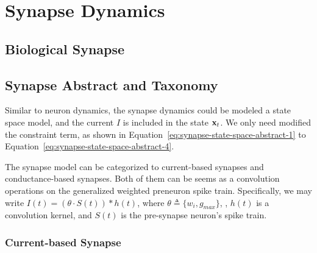 
\chapter{Synapse Dynamics}
\section{Biological Synapse}

\section{Synapse Abstract and Taxonomy}
Similar to neuron dynamics, the synapse dynamics could be modeled a state space model,
and the current $I$ is included in the state $\bold x_t$. We only need modified the 
constraint term, as shown in Equation~\ref{eq:synapse-state-space-abstract-1} to 
Equation~\ref{eq:synapse-state-space-abstract-4}. 


The synapse model can be categorized to current-based synapses and 
conductance-based synapses. Both of them can be seems as a 
convolution operations on the generalized weighted preneuron spike train.
Specifically, we may write $I(t)=(\theta\cdot S(t)) * h(t)$, where $\theta\triangleq \{w_i, g_{max}\}$, 
, $h(t)$ is a convolution kernel, and $S(t)$ is the pre-synapse neuron's spike train.


\subsection{Current-based Synapse}

